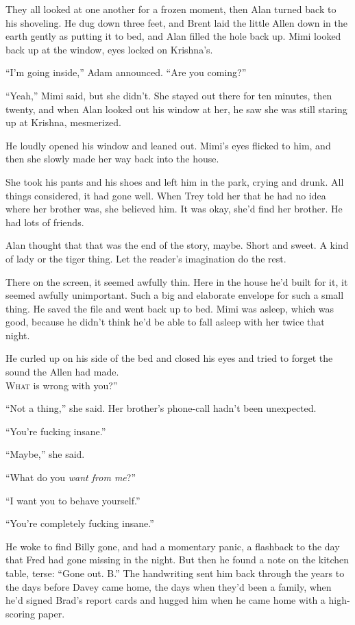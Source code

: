 They all looked at one another for a frozen moment, then Alan turned
back to his shoveling.  He dug down three feet, and Brent laid the
little Allen down in the earth gently as putting it to bed, and Alan
filled the hole back up.  Mimi looked back up at the window, eyes
locked on Krishna's.

``I'm going inside,'' Adam announced.  ``Are you coming?''

``Yeah,'' Mimi said, but she didn't.  She stayed out there for ten
minutes, then twenty, and when Alan looked out his window at her, he
saw she was still staring up at Krishna, mesmerized.

He loudly opened his window and leaned out.  Mimi's eyes flicked to
him, and then she slowly made her way back into the house.

She took his pants and his shoes and left him in the park, crying and
drunk.  All things considered, it had gone well.  When Trey told her
that he had no idea where her brother was, she believed him.  It was
okay, she'd find her brother.  He had lots of friends.

Alan thought that that was the end of the story, maybe.  Short and
sweet.  A kind of lady or the tiger thing.  Let the reader's
imagination do the rest.

There on the screen, it seemed awfully thin.  Here in the house he'd
built for it, it seemed awfully unimportant.  Such a big and elaborate
envelope for such a small thing.  He saved the file and went back up
to bed.  Mimi was asleep, which was good, because he didn't think he'd
be able to fall asleep with her twice that night.

He curled up on his side of the bed and closed his eyes and tried to
forget the sound the Allen had made.
\\
\lettrine[lines=3, lhang=.5, nindent=0pt, findent=2pt]{W}{hat}
is wrong with you?''

``Not a thing,'' she said.  Her brother's phone-call hadn't been
unexpected. 

``You're fucking insane.''

``Maybe,'' she said. 

``What do you \textit{want from me}?''

``I want you to behave yourself.''

``You're completely fucking insane.''

He woke to find Billy gone, and had a momentary panic, a flashback to
the day that Fred had gone missing in the night.  But then he found a
note on the kitchen table, terse:  ``Gone out.  B.'' The handwriting
sent him back through the years to the days before Davey came home,
the days when they'd been a family, when he'd signed Brad's report
cards and hugged him when he came home with a high-scoring paper.

